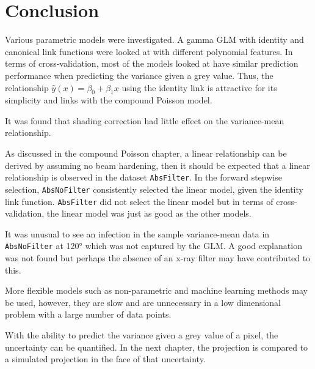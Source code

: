 \section{Conclusion}

Various parametric models were investigated. A gamma GLM with identity and canonical link functions were looked at with different polynomial features. In terms of cross-validation, most of the models looked at have similar prediction performance when predicting the variance given a grey value. Thus, the relationship $\widehat{y}(x)=\beta_0+\beta_1 x$ using the identity link is attractive for its simplicity and links with the compound Poisson model.

It was found that shading correction had little effect on the variance-mean relationship.

As discussed in the compound Poisson chapter, a linear relationship can be derived by assuming no beam hardening, then it should be expected that a linear relationship is observed in the dataset \texttt{AbsFilter}. In the forward stepwise selection, \texttt{AbsNoFilter} consistently selected the linear model, given the identity link function. \texttt{AbsFilter} did not select the linear model but in terms of cross-validation, the linear model was just as good as the other models.

It was unusual to see an infection in the sample variance-mean data in \texttt{AbsNoFilter} at \ang{120} which was not captured by the GLM. A good explanation was not found but perhaps the absence of an x-ray filter may have contributed to this.

More flexible models such as non-parametric and machine learning methods may be used, however, they are slow and are unnecessary in a low dimensional problem with a large number of data points.

With the ability to predict the variance given a grey value of a pixel, the uncertainty can be quantified. In the next chapter, the projection is compared to a simulated projection in the face of that uncertainty.